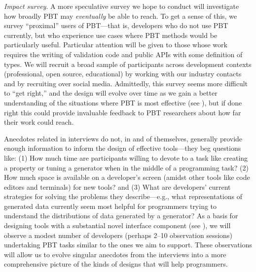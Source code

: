 \emph{Impact survey}. A more speculative survey we hope to conduct
will investigate
how broadly PBT may {\em eventually} be able to reach.  To get a sense of this, we
survey ``proximal'' users of PBT---that is, developers who do not use PBT
currently, but who experience use cases where PBT methods would be particularly
useful.  Particular attention will be given to those whose work requires the
writing of validation code and public APIs with some definition of types. We
will recruit a broad sample of participants across development contexts
(professional, open source, educational) by working with our industry contacts
and by recruiting over social media. Admittedly, this survey seems more
difficult to ``get right,'' and the design will evolve over time as we gain a
better understanding of the situations where PBT is most effective
(see ), but if done right this could provide invaluable
feedback to PBT researchers about how far their work could reach.


%
Anecdotes related in interviews do not, in and of
themselves, generally provide enough information to inform the design of
effective tools---they beg questions like: (1) How much time
are participants willing to devote to
a task like creating a property or tuning a generator when in the
middle of a programming task? (2) How much space is available on a developer's
screen (amidst other tools like code editors and terminals) for
new
tools? and (3) What are developers' current strategies for solving the
problems they describe---e.g., what representations of generated data
currently seem most helpful
for programmers trying to understand the distributions of data generated by a
generator? As a basis for designing tools with a substantial novel interface
component (see ), we will observe a modest number
of developers (perhaps 2--10 observation sessions)
undertaking PBT tasks similar to the ones we
aim to support. These observations will allow us to evolve
singular anecdotes from the interviews into a more comprehensive picture of
the kinds of designs that will help programmers.

